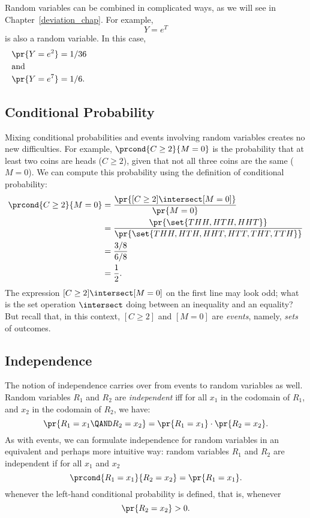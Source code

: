 Random variables can be combined in complicated ways, as we will see
in Chapter~\ref{deviation_chap}.  For example,
\begin{equation*}
    Y = e^T
\end{equation*}
is also a random variable.  In this case,
\begin{align*}
    \pr{Y = e^2} &= 1/36 \\
\noalign{\noindent and}
    \pr{Y = e^7} &= 1/6.
\end{align*}

\subsection{Conditional Probability}

Mixing conditional probabilities and events involving random variables
creates no new difficulties.  For example, $\prcond{C \geq 2}{M = 0}$
is the probability that at least two coins are heads ($C \geq 2$),
given that not all three coins are the same ($M = 0$).  We can compute
this probability using the definition of conditional probability:
\begingroup{}
\begin{align*}
\prcond{C \geq 2}{M = 0}
        & =    \frac{\pr{[C \geq 2] \intersect [M = 0]}}{\pr{M = 0}} \\
        & =    \frac{\pr{\set{THH, HTH, HHT}}}
                        {\pr{\set{THH, HTH, HHT, HTT, THT, TTH }}} \\
        & =    \frac{3/8}{6/8} \\
        & = \frac{1}{2}.
\end{align*}
\endgroup
The expression $[C \geq 2] \intersect [M = 0]$ on the first line may look odd;
what is the set operation $\intersect$ doing between an inequality and an
equality?  But recall that, in this context, $[C \geq 2]$ and $[M = 0]$
are \emph{events}, namely, \emph{sets} of outcomes.

\subsection{Independence}

The notion of independence carries over from events to random variables as
well.  Random variables $R_1$ and $R_2$ are  \emph{independent} iff for all $x_1$ in the codomain of
$R_1$, and $x_2$ in the codomain of $R_2$, we have:
\[
\pr{R_1 = x_1 \QAND R_2 = x_2}  =  \pr{R_1 = x_1} \cdot \pr{R_2 = x_2}.
\]
As with events, we can formulate independence for random
variables in an equivalent and perhaps more intuitive way: random
variables $R_1$ and $R_2$ are independent if for all $x_1$ and $x_2$
\[
\prcond{R_1 = x_1}{R_2 = x_2}  =  \pr{R_1 = x_1}.
\]
whenever the left-hand conditional probability is defined, that is,
whenever
\begin{equation*}
    \pr{R_2 = x_2} > 0.
\end{equation*}

